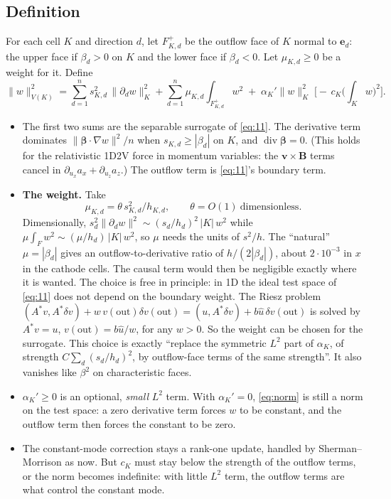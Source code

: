 \documentclass[11pt]{article}
\theoremstyle{remark}
\newcommand{\bbeta}{\boldsymbol{\beta}}
\newcommand{\bv}{\boldsymbol{v}}
\begin{document}
\subsection{Definition}

For each cell $K$ and direction $d$, let $F^+_{K,d}$ be the outflow face of $K$ normal to $\mathbf e_d$: the upper face
if $\beta_d>0$ on $K$ and the lower face if $\beta_d<0$.  Let $\mu_{K,d}\ge0$ be a weight for it.  Define
\begin{equation}\label{eq:norm}
  \|w\|_{V(K)}^2 = \sum_{d=1}^n s_{K,d}^2\,\|\partial_d w\|_K^2 + \sum_{d=1}^n \mu_{K,d}\int_{F^+_{K,d}} w^2
  \;+\;\alpha_K'\|w\|_K^2 \;\bigl[-\,c_K\bigl(\textstyle\int_K w\bigr)^2\bigr].
\end{equation}
\begin{itemize}[nosep]
  \item The first two sums are the separable surrogate of \eqref{eq:11}.  The derivative term dominates
        $\|\bbeta\cdot\nabla w\|^2/n$ when $s_{K,d}\ge|\beta_d|$ on $K$, and $\operatorname{div}\bbeta=0$.  (This
        holds for the relativistic 1D2V force in momentum variables: the $\bv\times\mathbf B$ terms cancel in
        $\partial_{u_x}a_x+\partial_{u_z}a_z$.)  The outflow term is \eqref{eq:11}'s boundary term.
  \item \textbf{The weight.}  Take
        \[ \mu_{K,d} = \theta\, s_{K,d}^2/h_{K,d},\qquad \theta=O(1)\ \text{dimensionless}. \]
        Dimensionally, $s_d^2\|\partial_dw\|^2\sim(s_d/h_d)^2\,|K|\,w^2$ while $\mu\int_Fw^2\sim(\mu/h_d)\,|K|\,w^2$,
        so $\mu$ needs the units of $s^2/h$.  The ``natural'' $\mu=|\beta_d|$ gives an outflow-to-derivative ratio
        of $h/(2|\beta_d|)$, about $2\cdot10^{-3}$ in $x$ in the cathode cells.  The causal term would then be
        negligible exactly where it is wanted.  The choice is free in principle: in 1D the ideal test space of
        \eqref{eq:11} does not depend on the boundary weight.  The Riesz problem
        $(A^*v,A^*\delta v)+w\,v(\mathrm{out})\delta v(\mathrm{out})=(u,A^*\delta v)+b\hat u\,\delta v(\mathrm{out})$
        is solved by $A^*v=u$, $v(\mathrm{out})=b\hat u/w$, for any $w>0$.  So the weight can be chosen for the
        surrogate.  This choice is exactly ``replace the symmetric $L^2$ part of $\alpha_K$, of strength
        $C\sum_d(s_d/h_d)^2$, by outflow-face terms of the same strength''.  It also vanishes like $\beta^2$ on
        characteristic faces.
  \item $\alpha_K'\ge0$ is an optional, \emph{small} $L^2$ term.  With $\alpha_K'=0$, \eqref{eq:norm} is still a norm
        on the test space: a zero derivative term forces $w$ to be constant, and the outflow term then forces the
        constant to be zero.
  \item The constant-mode correction stays a rank-one update, handled by Sherman--Morrison as now.  But $c_K$ must stay
        below the strength of the outflow terms, or the norm becomes indefinite: with little $L^2$ term, the outflow
        terms are what control the constant mode.
\end{itemize}
\end{document}
